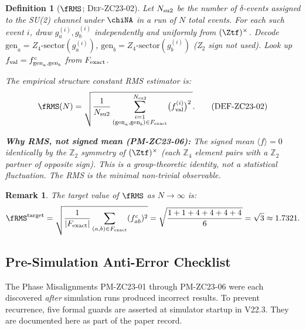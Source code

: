 \documentclass[12pt, a4paper]{article}
\newtheorem{definition}{Definition}[section]
\newtheorem{remark}{Remark}[section]
\begin{document}
\begin{definition}[$\fRMS$; \textsc{Def-ZC23-02}]
\label{zc23:def:frms}
Let $N_{\rm su2}$ be the number of $\delta$-events assigned to the SU(2)
channel under $\chiNA$ in a run of $N$ total events.
For each such event $i$, draw $g_a^{(i)}, g_b^{(i)}$ independently
and uniformly from $(\Ztf)^\times$.
Decode $\mathrm{gen}_a = Z_4\text{-sector}(g_a^{(i)})$,
$\mathrm{gen}_b = Z_4\text{-sector}(g_b^{(i)})$ (Z$_2$ sign not used).
Look up $f_{\rm val} = f^c_{\mathrm{gen}_a,\mathrm{gen}_b}$ from
$F_{\rm exact}$.

The \emph{empirical structure constant RMS estimator} is:
\begin{equation}
  \fRMS(N) = \sqrt{\frac{1}{N_{\rm su2}}
    \sum_{\substack{i=1 \\ (\mathrm{gen}_a,\mathrm{gen}_b)\in F_{\rm exact}}}^{N_{\rm su2}}
    \bigl(f_{\rm val}^{(i)}\bigr)^2\,}.
  \tag{DEF-ZC23-02}
\end{equation}

\textbf{Why RMS, not signed mean (PM-ZC23-06):}
The signed mean $\langle f\rangle = 0$ identically by
the $\mathbb{Z}_2$ symmetry of $(\Ztf)^\times$
(each $\mathbb{Z}_4$ element pairs with a $\mathbb{Z}_2$ partner
of opposite sign). This is a group-theoretic identity, not a statistical
fluctuation. The RMS is the minimal non-trivial observable.
\end{definition}

\begin{remark}
The target value of $\fRMS$ as $N\to\infty$ is:
\begin{equation}
  \fRMS^{\rm target}
  = \sqrt{\frac{1}{|F_{\rm exact}|}\sum_{(a,b)\in F_{\rm exact}} (f^c_{ab})^2}
  = \sqrt{\frac{1+1+4+4+4+4}{6}}
  = \sqrt{3} \approx 1.7321.
  \label{zc23:eq:frms-target}
\end{equation}
\end{remark}

\subsection{Pre-Simulation Anti-Error Checklist}
\label{zc23:sec:guards}

The Phase Misalignments PM-ZC23-01 through PM-ZC23-06 were each
discovered \emph{after} simulation runs produced incorrect results.
To prevent recurrence, five formal guards are asserted at simulator
startup in V22.3. They are documented here as part of the paper
record.
\end{document}
